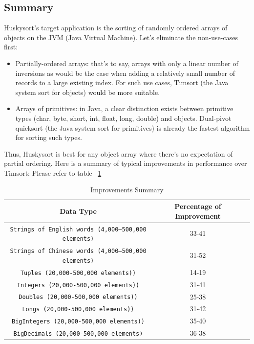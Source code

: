 \documentclass[acmtog]{acmart}
\begin{document}
\subsection{Summary}
Huskysort’s target application is the sorting of randomly ordered arrays of objects on the JVM (Java Virtual Machine).
Let’s eliminate the non-use-cases first:
\begin{itemize}
\item {}Partially-ordered arrays: that’s to say, arrays with only a linear number of inversions as would be the case when adding a relatively small number of records to a large existing index.
For such use cases, Timsort (the Java system sort for objects) would be more suitable.

\item {}Arrays of primitives: in Java, a clear distinction exists between primitive types (char, byte, short, int, float, long, double) and objects.
Dual-pivot quicksort (the Java system sort for primitives) is already the fastest algorithm for sorting such types.
\end{itemize}
Thus, Huskysort is best for any object array where there’s no expectation of partial ordering.
Here is a summary of typical improvements in performance over Timsort:
Please refer to table ~\ref{tab:Improvements Summary}

\begin{table}
  \caption{Improvements Summary}
  \label{tab:Improvements Summary}
  \begin{tabular}{ccl}
    \toprule
    Data Type  &  Percentage of Improvement\\
    \midrule
    \texttt{Strings of English words (4,000—500,000 elements)} &  33-41 \\
    \texttt{Strings of Chinese words (4,000—500,000 elements)}&  31-52\\
    \texttt{Tuples (20,000-500,000 elements))}&  14-19\\
    \texttt{Integers (20,000-500,000 elements))}&  31-41\\
    \texttt{Doubles (20,000-500,000 elements))}&  25-38\\
    \texttt{Longs (20,000-500,000 elements))}&  31-42\\
    \texttt{BigIntegers (20,000-500,000 elements))}& 35-40\\
    \texttt{BigDecimals (20,000-500,000 elements)}&  36-38\\
    \bottomrule
  \end{tabular}
\end{table}
\end{document}
